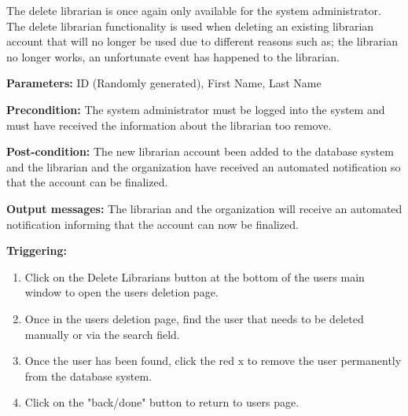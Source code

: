 The delete librarian is once again only available for the system administrator. The delete librarian functionality is used when deleting an existing librarian account that will no longer be used due to different reasons such as; the librarian no longer works, an unfortunate event has happened to the librarian.

\begin{description}

\item \textbf{Parameters:} ID (Randomly generated), First Name, Last Name

\item \textbf{Precondition:} The system administrator must be logged into the system and must have received the information about the librarian too remove. 

\item \textbf{Post-condition:} The new librarian account been added to the database system and the librarian and the organization have received an automated notification so that the account can be finalized. 

\item \textbf{Output messages:} The librarian and the organization will receive an automated notification informing that the account can now be finalized. 

\item \textbf{Triggering:}
\begin{enumerate}
\item Click on the Delete Librarians button at the bottom of the users main
window to open the users deletion page.

\item Once in the users deletion page, find the user that needs to be deleted manually or via the search field.

\item Once the user has been found, click the red x to remove the user permanently from the database system. 

\item Click on the "back/done" button to return to users page.

\end{enumerate}

\end{description}